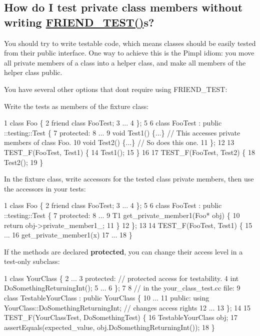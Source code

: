 \subsection*{How do I test private class members without writing \hyperlink{gtest__prod_8h_a8d443b4cc1d87a7a17943b8fbdbf3910}{F\+R\+I\+E\+N\+D\+\_\+\+T\+E\+S\+T()}s?}

You should try to write testable code, which means classes should be easily tested from their public interface. One way to achieve this is the Pimpl idiom\+: you move all private members of a class into a helper class, and make all members of the helper class public.

You have several other options that don\textquotesingle{}t require using {\ttfamily F\+R\+I\+E\+N\+D\+\_\+\+T\+E\+ST}\+:
\begin{DoxyItemize}
\item Write the tests as members of the fixture class\+: 
\begin{DoxyCode}
1 class Foo \{
2   friend class FooTest;
3   ...
4 \};
5 
6 class FooTest : public ::testing::Test \{
7  protected:
8   ...
9   void Test1() \{...\} // This accesses private members of class Foo.
10   void Test2() \{...\} // So does this one.
11 \};
12 
13 TEST\_F(FooTest, Test1) \{
14   Test1();
15 \}
16 
17 TEST\_F(FooTest, Test2) \{
18   Test2();
19 \}
\end{DoxyCode}

\item In the fixture class, write accessors for the tested class\textquotesingle{} private members, then use the accessors in your tests\+: 
\begin{DoxyCode}
1 class Foo \{
2   friend class FooTest;
3   ...
4 \};
5 
6 class FooTest : public ::testing::Test \{
7  protected:
8   ...
9   T1 get\_private\_member1(Foo* obj) \{
10     return obj->private\_member1\_;
11   \}
12 \};
13 
14 TEST\_F(FooTest, Test1) \{
15   ...
16   get\_private\_member1(x)
17   ...
18 \}
\end{DoxyCode}

\item If the methods are declared {\bfseries protected}, you can change their access level in a test-\/only subclass\+: 
\begin{DoxyCode}
1 class YourClass \{
2   ...
3  protected: // protected access for testability.
4   int DoSomethingReturningInt();
5   ...
6 \};
7 
8 // in the your\_class\_test.cc file:
9 class TestableYourClass : public YourClass \{
10   ...
11  public: using YourClass::DoSomethingReturningInt; // changes access rights
12   ...
13 \};
14 
15 TEST\_F(YourClassTest, DoSomethingTest) \{
16   TestableYourClass obj;
17   assertEquals(expected\_value, obj.DoSomethingReturningInt());
18 \}
\end{DoxyCode}

\end{DoxyItemize}


